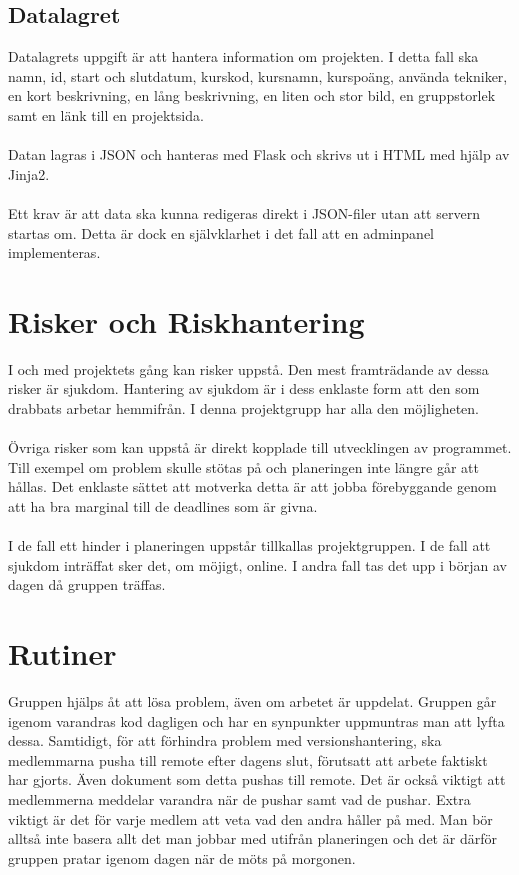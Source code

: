 \documentclass{TDP003mall}
\begin{document}
\subsection{Datalagret}
Datalagrets uppgift är att hantera information om projekten. I detta fall ska
namn, id, start och slutdatum, kurskod, kursnamn, kurspoäng, använda tekniker,
en kort beskrivning, en lång beskrivning, en liten och stor bild, en gruppstorlek
samt en länk till en projektsida.\\\\
Datan lagras i JSON och hanteras med Flask och skrivs ut i HTML med hjälp av Jinja2.\\\\
Ett krav är att data ska kunna redigeras direkt i JSON-filer utan att servern startas om.
Detta är dock en självklarhet i det fall att en adminpanel implementeras.

\pagebreak

\section{Risker och Riskhantering}
I och med projektets gång kan risker uppstå. Den mest framträdande av dessa risker
är sjukdom. Hantering av sjukdom är i dess enklaste form att den som drabbats arbetar hemmifrån.
I denna projektgrupp har alla den möjligheten. \\\\
Övriga risker som kan uppstå är direkt kopplade till utvecklingen av programmet.
Till exempel om problem skulle stötas på och planeringen inte längre går att hållas.
Det enklaste sättet att motverka detta är att jobba förebyggande genom 
att ha bra marginal till de deadlines som är givna.\\\\
I de fall ett hinder i planeringen uppstår tillkallas projektgruppen. I de fall att
sjukdom inträffat sker det, om möjigt, online. I andra fall tas det upp i början av dagen
då gruppen träffas.

\section{Rutiner}
Gruppen hjälps åt att lösa problem, även om arbetet är uppdelat. Gruppen går igenom varandras kod dagligen och har en synpunkter
uppmuntras man att lyfta dessa. Samtidigt, för att förhindra problem med versionshantering, ska medlemmarna pusha till remote efter dagens slut,
förutsatt att arbete faktiskt har gjorts. Även dokument som detta pushas till remote. Det är också viktigt att medlemmerna meddelar varandra
när de pushar samt vad de pushar. Extra viktigt är det för varje medlem att veta vad den andra håller på med. Man bör alltså inte basera allt
det man jobbar med utifrån planeringen och det är därför gruppen pratar igenom dagen när de möts på morgonen. 
\end{document}
